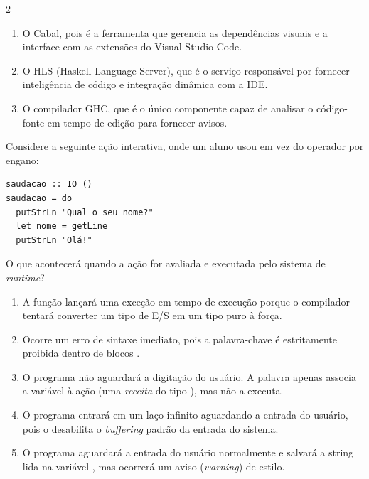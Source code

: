 \documentclass[a4paper,10pt,brazil]{article}
\begin{document}
\begin{multicols}{2}
\begin{enumerate}
  \item O Cabal, pois é a ferramenta que gerencia as dependências visuais e a interface com as extensões do Visual Studio Code.

  \item O HLS (Haskell Language Server), que é o serviço responsável por fornecer inteligência de código e integração dinâmica com a IDE.

  \item O compilador GHC, que é o único componente capaz de analisar o código-fonte em tempo de edição para fornecer avisos.


\end{enumerate}

Considere a seguinte ação interativa, onde um aluno usou  em vez do operador \haskellinline{<-} por engano:

\begin{verbatim}
saudacao :: IO ()
saudacao = do
  putStrLn "Qual o seu nome?"
  let nome = getLine
  putStrLn "Olá!"
\end{verbatim}

O que acontecerá quando a ação  for avaliada e executada pelo sistema de \emph{runtime}?

\begin{enumerate}
  \item A função  lançará uma exceção em tempo de execução porque o compilador tentará converter um tipo de E/S em um tipo puro à força.

  \item Ocorre um erro de sintaxe imediato, pois a palavra-chave  é estritamente proibida dentro de blocos .

  \item O programa não aguardará a digitação do usuário. A palavra  apenas associa a variável  à ação (uma \emph{receita} do tipo ), mas não a executa.

  \item O programa entrará em um laço infinito aguardando a entrada do usuário, pois o  desabilita o \emph{buffering} padrão da entrada do sistema.

  \item O programa aguardará a entrada do usuário normalmente e salvará a string lida na variável , mas ocorrerá um aviso (\emph{warning}) de estilo.



\end{enumerate}
\end{multicols}
\end{document}
